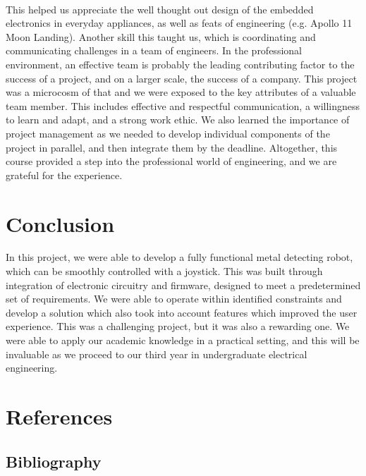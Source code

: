 \documentclass{article}
\begin{document}
\

This helped us appreciate the well thought out design of the embedded electronics in everyday appliances, as well as feats of engineering (e.g. Apollo 11 Moon Landing). Another skill this taught us, which
is coordinating and communicating challenges in a team of engineers. In the professional environment, an effective team is probably the leading contributing factor to the success of a project, and
on a larger scale, the success of a company. This project was a microcosm of that and we were exposed to the key attributes of a valuable team member. This includes effective and respectful communication,
a willingness to learn and adapt, and a strong work ethic. We also learned the importance of project management as we needed to develop individual components of the project in parallel, and then integrate them
by the deadline. Altogether, this course provided a step into the professional world of engineering, and we are grateful for the experience.


\section{Conclusion}

In this project, we were able to develop a fully functional metal detecting robot, which can be smoothly controlled with a joystick. This was built through integration of electronic circuitry and firmware, designed
to meet a predetermined set of requirements. We were able to operate within identified constraints and develop a solution which also took into account features which
improved the user experience. This was a challenging project, but it was also a rewarding one. We were able to apply our academic knowledge in a practical setting, and
this will be invaluable as we proceed to our third year in undergraduate electrical engineering.

\renewcommand{\refname}{}

\newpage

\section{References}
\begin{thebibliography}{10}

\section{Bibliography}


\end{thebibliography}
\end{document}
